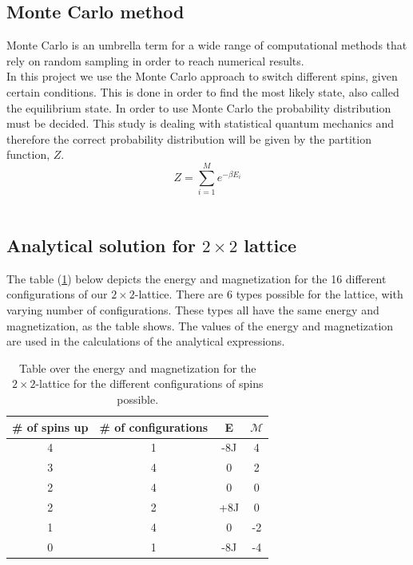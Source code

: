 \documentclass{article}
\begin{document}
\subsection{Monte Carlo method} \label{sec:montecarlo}

Monte Carlo is an umbrella term for a wide range of computational methods that rely on random sampling in order to reach numerical results. \\

In this project we use the Monte Carlo approach to switch different spins, given certain conditions. This is done in order to find the most likely state, also called the equilibrium state. In order to use Monte Carlo the probability distribution must be decided. This study is dealing with statistical quantum mechanics and therefore the correct probability distribution will be given by the partition function, $Z$. \\

$$Z = \sum_{i=1}^{M} e^{-\beta E_i} $$ \\


\subsection{Analytical solution for \texorpdfstring{ $2 \times 2$ }{text} lattice} \label{sec:analyticalsolution}

The table (\ref{tab:2x2lattice}) below depicts the energy and magnetization for the 16 different configurations of our $2 \times 2$-lattice. There are 6 types possible for the lattice, with varying number of configurations. These types all have the same energy and magnetization, as the table shows. The values of the energy and magnetization are used in the calculations of the analytical expressions. \\

  \begin{table}[ht]
    \centering
    \caption{Table over the energy and magnetization for the $2 \times 2$-lattice for the different configurations of spins possible. }
    \vspace{2mm}
    \label{tab:2x2lattice}
    \begin{tabular}{|c|c|c|c|}
        \hline
        \# of spins up & \# of configurations & E & $\mathcal{M}$ \\
        \hline \hline
        4 & 1 & -8J & 4 \\
        3 & 4 & 0 & 2 \\
        2 & 4 & 0 & 0 \\
        2 & 2 & +8J & 0 \\
        1 & 4 & 0 & -2 \\
        0 & 1 & -8J & -4 \\
        \hline
    \end{tabular} \\
    \hspace{0pt}\\
  \end{table}
\end{document}

